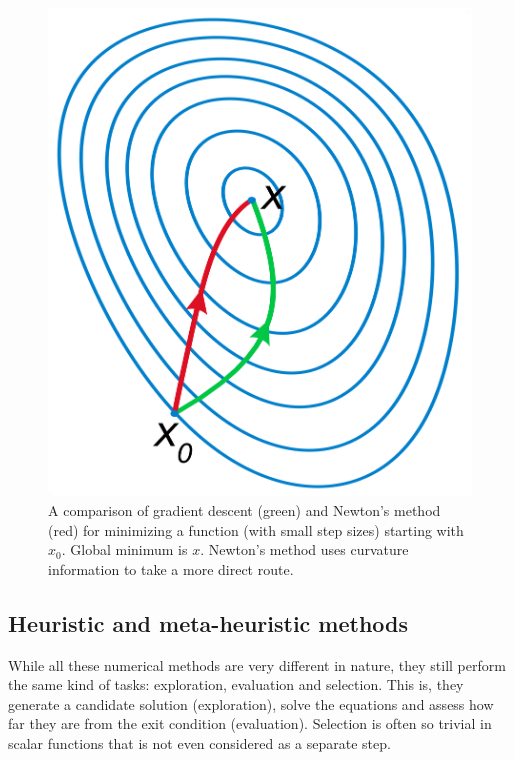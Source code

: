 \begin{figure}[hbtp]
	\includegraphics[width=\textwidth]{./figures/04/gradientdescent.png}
	\caption[Gradient descent vs Newton's optimization]{A comparison of gradient descent (green) and Newton's method (red) for minimizing a function (with small step sizes) starting with $ x_{0} $. Global minimum is $ x $. Newton's method uses curvature information to take a more direct route.}
	\label{fig:gradientdescent}
\end{figure}

\subsection{Heuristic and meta-heuristic methods}
While all these numerical methods are very different in nature, they still perform the same kind of tasks: exploration, evaluation and selection. This is, they generate a candidate solution (exploration), solve the equations and assess how far they are from the exit condition (evaluation). Selection is often so trivial in scalar functions that is not even considered as a separate step.

